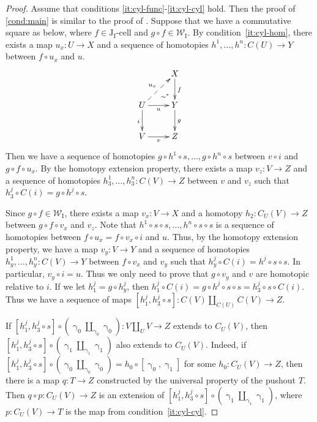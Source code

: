\documentclass{tac}
\theoremstyle{definition}
\newcommand{\we}{\mathcal{W}}
\newcommand{\I}{\mathrm{I}}
\newcommand{\J}{\mathrm{J}}
\newcommand{\class}[2]{#1\text{-}\mathrm{#2}}
\newcommand{\Icell}[1][\I]{\class{#1}{cell}}
\newcommand{\Jcell}[1][]{\Icell[\J#1]}
\newcommand{\cyli}{\upgamma}
\begin{document}
\begin{proof}
Assume that conditions \eqref{it:cyl-func}-\eqref{it:cyl-cyl} hold.
Then the proof of \eqref{cond:main} is similar to the proof of .
Suppose that we have a commutative square as below, where $f \in \Jcell[_\I]$ and $g \circ f \in \we_\I$.
By condition~\eqref{it:cyl-hom}, there exists a map $u_x : U \to X$ and a sequence of homotopies $h^1, \ldots, h^n : C(U) \to Y$ between $f \circ u_x$ and $u$.
\[ \xymatrix{   \ar@{}[dr]|(.7){\sim^*}               & X \ar[d]^f \\
              U \ar@{-->}[ur]^{u_x} \ar[d]_i \ar[r]_u & Y \ar[d]^g \\
              V \ar[r]_v                              & Z
            } \]
Then we have a sequence of homotopies $g \circ h^1 \circ s, \ldots, g \circ h^n \circ s$ between $v \circ i$ and $g \circ f \circ u_x$.
By the homotopy extension property, there exists a map $v_z : V \to Z$ and a sequence of homotopies $h^1_3, \ldots, h^n_3 : C(V) \to Z$ between $v$ and $v_z$ such that $h^j_3 \circ C(i) = g \circ h^j \circ s$.

Since $g \circ f \in \we_\I$, there exists a map $v_x : V \to X$ and a homotopy $h_2 : C_U(V) \to Z$ between $g \circ f \circ v_x$ and $v_z$.
Note that $h^1 \circ s \circ s, \ldots, h^n \circ s \circ s$ is a sequence of homotopies between $f \circ u_x = f \circ v_x \circ i$ and $u$.
Thus, by the homotopy extension property, we have a map $v_y : V \to Y$ and a sequence of homotopies $h^1_y, \ldots, h^n_y : C(V) \to Y$ between $f \circ v_x$ and $v_y$ such that $h^j_y \circ C(i) = h^j \circ s \circ s$.
In particular, $v_y \circ i = u$.
Thus we only need to prove that $g \circ v_y$ and $v$ are homotopic relative to $i$.
If we let $h^j_1 = g \circ h^j_y$, then $h^j_1 \circ C(i) = g \circ h^j \circ s \circ s = h^j_3 \circ s \circ C(i)$.
Thus we have a sequence of maps $[h^j_1, h^j_3 \circ s] : C(V) \amalg_{C(U)} C(V) \to Z$.

If $[h^j_1, h^j_3 \circ s] \circ (\cyli_0 \amalg_{\cyli_0} \cyli_0) : V \amalg_U V \to Z$ extends to $C_U(V)$, then $[h^j_1, h^j_3 \circ s] \circ (\cyli_1 \amalg_{\cyli_1} \cyli_1)$ also extends to $C_U(V)$.
Indeed, if $[h^j_1, h^j_3 \circ s] \circ (\cyli_0 \amalg_{\cyli_0} \cyli_0) = h_0 \circ [\cyli_0,\cyli_1]$ for some $h_0 : C_U(V) \to Z$,
then there is a map $q : T \to Z$ constructed by the universal property of the pushout $T$.
Then $q \circ p : C_U(V) \to Z$ is an extension of $[h^j_1, h^j_3 \circ s] \circ (\cyli_1 \amalg_{\cyli_1} \cyli_1)$, where $p : C_U(V) \to T$ is the map from condition~\eqref{it:cyl-cyl}.


\end{proof}
\end{document}
